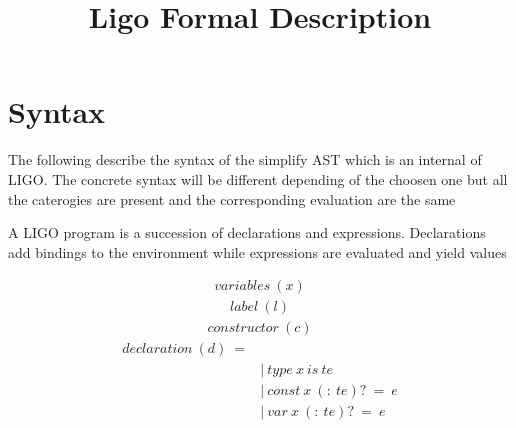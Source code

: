 \documentclass[10pt,a4paper]{article}
\title{Ligo Formal Description}
\author{}
\date{}
\begin{document}
\maketitle
\section*{ Syntax }
The following describe the syntax of the simplify AST which is an internal of LIGO. The concrete syntax will be different depending of the choosen one but all the caterogies are present and the corresponding evaluation are the same

A LIGO program is a succession of declarations and expressions. Declarations add bindings to the environment while expressions are evaluated and yield values

\begin{align*}
variables\ (x)
\end{align*}
\begin{align*}
label\ (l)
\end{align*}
\begin{align*}
constructor\ (c)
\end{align*}
\begin{align*}
declaration\ (d)\ = 
\\
 \ &|\ type\ x\ is\ te                     \tag{Type\ declaration}
\\
 \ &|\ const\ x\ (:\ te)?\ =\ e               \tag{Constant\ declaration}
\\
 \ &|\ var  \ x\ (:\ te)?\ =\ e               \tag{Variable\ declaration}
\end{align*}
\end{document}
